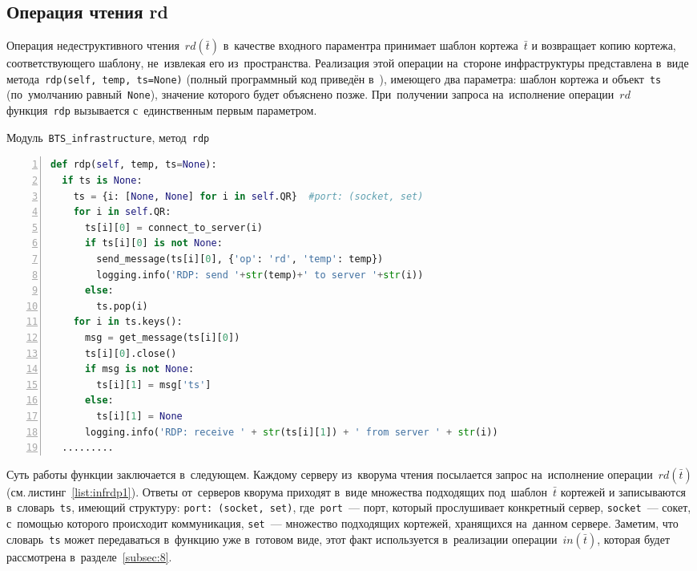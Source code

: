 \subsection{Операция чтения rd}\label{subsec:7}
Операция недеструктивного чтения~$rd(\bar t)$ в~качестве входного параментра принимает шаблон кортежа~$\bar t$ и возвращает копию кортежа, соответствующего шаблону, не~извлекая его из~пространства. Реализация этой операции на~стороне инфраструктуры представлена в~виде метода~\texttt{rdp(self, temp, ts=None)} (полный программный код приведён в~\autocite{mybts}), имеющего два параметра: шаблон кортежа и объект~\texttt{ts} (по~умолчанию равный~\texttt{None}), значение которого будет объяснено позже. При~получении запроса на~исполнение операции~$rd$ функция~\texttt{rdp} вызывается с~единственным первым параметром.

\begin{ListingEnv}\caption{Модуль~\texttt{BTS\_infrastructure}, метод~\texttt{rdp}}\label{list:infrdp1}
	\begin{lstlisting}[language=Python, numbers=left]
def rdp(self, temp, ts=None):
  if ts is None:
    ts = {i: [None, None] for i in self.QR}  #port: (socket, set)
    for i in self.QR:
      ts[i][0] = connect_to_server(i)
      if ts[i][0] is not None:
        send_message(ts[i][0], {'op': 'rd', 'temp': temp})
        logging.info('RDP: send '+str(temp)+' to server '+str(i))
      else:
        ts.pop(i)
    for i in ts.keys():
      msg = get_message(ts[i][0])
      ts[i][0].close()
      if msg is not None:
        ts[i][1] = msg['ts']
      else:
        ts[i][1] = None
      logging.info('RDP: receive ' + str(ts[i][1]) + ' from server ' + str(i))
  .........
	\end{lstlisting}
\end{ListingEnv}

Суть работы функции заключается в~следующем. Каждому серверу из~кворума чтения посылается запрос на~исполнение операции~$rd(\bar t)$ (см.\,листинг~\ref{list:infrdp1}). Ответы от~серверов кворума приходят в~виде множества подходящих под~шаблон~$\bar t$ кортежей и записываются в~словарь~\texttt{ts}, имеющий структуру: \texttt{port: (socket, set)}, где~\texttt{port}~--- порт, который прослушивает конкретный сервер, \texttt{socket}~--- сокет, с~помощью которого происходит коммуникация, \texttt{set}~--- множество подходящих кортежей, хранящихся на~данном сервере. Заметим, что словарь~\texttt{ts} может передаваться в~функцию уже в~готовом виде, этот факт используется в~реализации операции~$in(\bar t)$, которая будет рассмотрена в~разделе~\ref{subsec:8}.

